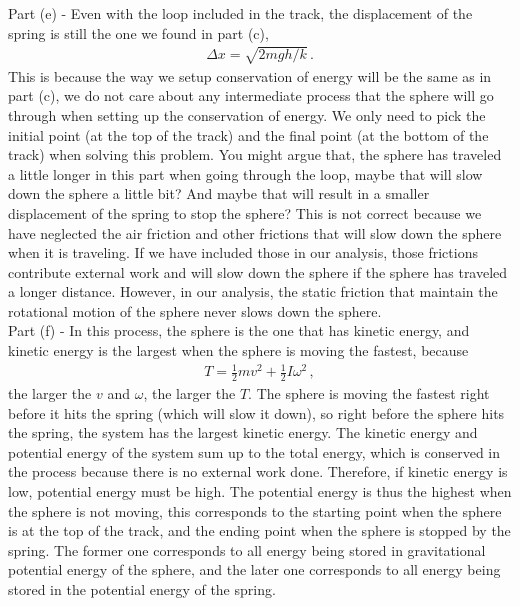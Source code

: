 \documentclass[11pt]{article}
\begin{document}
\noindent Part (e) - Even with the loop included in the track, the displacement of the spring is still the one we found in part (c), 
\begin{align*}
\Delta x = \sqrt{2mgh/k}\,.
\end{align*}
This is because the way we setup conservation of energy will be the same as in part (c), we do not care about any intermediate process that the sphere will go through when setting up the conservation of energy. We only need to pick the initial point (at the top of the track) and the final point (at the bottom of the track) when solving this problem. You might argue that, the sphere has traveled a little longer in this part when going through the loop, maybe that will slow down the sphere a little bit? And maybe that will result in a smaller displacement of the spring to stop the sphere? This is not correct because we have neglected the air friction and other frictions that will slow down the sphere when it is traveling. If we have included those in our analysis, those frictions contribute external work and will slow down the sphere if the sphere has traveled a longer distance. However, in our analysis, the static friction that maintain the rotational motion of the sphere never slows down the sphere. \\

Part (f) - In this process, the sphere is the one that has kinetic energy, and kinetic energy is the largest when the sphere is moving the fastest, because
\begin{align*}
T = \frac{1}{2}mv^2 + \frac{1}{2}I\omega^2\,,
\end{align*}
the larger the $v$ and $\omega$, the larger the $T$. The sphere is moving the fastest right before it hits the spring (which will slow it down), so right before the sphere hits the spring, the system has the largest kinetic energy. The kinetic energy and potential energy of the system sum up to the total energy, which is conserved in the process because there is no external work done. Therefore, if kinetic energy is low, potential energy must be high. The potential energy is thus the highest when the sphere is not moving, this corresponds to the starting point when the sphere is at the top of the track, and the ending point when the sphere is stopped by the spring. The former one corresponds to all energy being stored in gravitational potential energy of the sphere, and the later one corresponds to all energy being stored in the potential energy of the spring.\\
\end{document}
